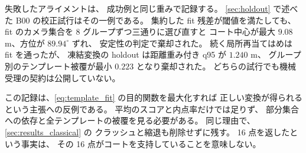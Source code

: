 失敗したアライメントは、
成功例と同じ重みで記録する。
\cref{sec:holdout} で述べた B00 の校正試行はその一例である。
集約した fit 残差が閾値を満たしても、
fit のカメラ集合を 8 グループずつ三通りに選び直すと
コート中心が最大 \(9.08\) m、方位が \(89.94^\circ\) ずれ、
安定性の判定で棄却された。
続く局所再当てはめは fit を通ったが、
凍結変換の holdout は距離重み付き q95 が \(1.240\) m、
グループ別のテンプレート被覆が最小 \(0.223\) となり棄却された。
どちらの試行でも機械受理の契約は公開していない。

この記録は、\cref{eq:template_fit} の目的関数を最大化すれば
正しい変換が得られるという主張への反例である。
平均のスコアと内点率だけでは足りず、
部分集合への依存と全テンプレートの被覆を見る必要がある。
同じ理由で、\cref{sec:results_classical} の
クラッシュと縮退も削除せずに残す。
16 点を返したという事実は、
その 16 点がコートを支持していることを意味しない。
